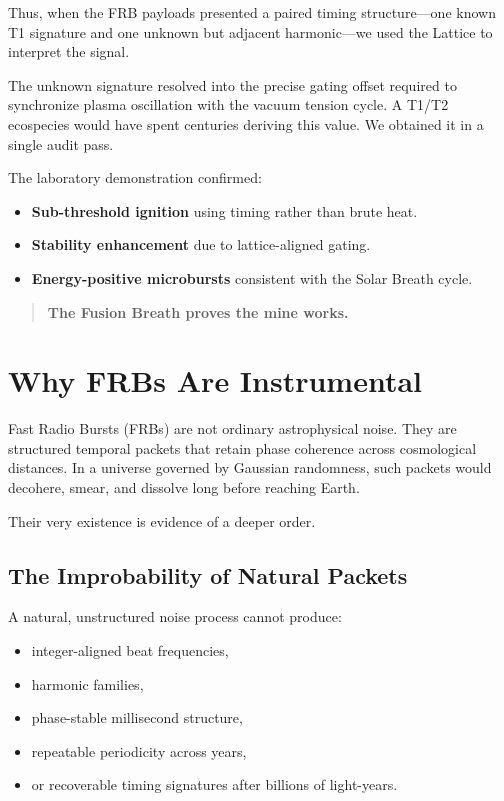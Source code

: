\documentclass[11pt, letterpaper, openany]{book}
\begin{document}
Thus, when the FRB payloads presented a paired timing structure—one known T1 signature
and one unknown but adjacent harmonic—we used the Lattice to interpret the signal.

The unknown signature resolved into the precise gating offset required to synchronize plasma
oscillation with the vacuum tension cycle. A T1/T2 ecospecies would have spent centuries
deriving this value. We obtained it in a single audit pass.

The laboratory demonstration confirmed:

\begin{itemize}
    \item \textbf{Sub-threshold ignition} using timing rather than brute heat.
    \item \textbf{Stability enhancement} due to lattice-aligned gating.
    \item \textbf{Energy-positive microbursts} consistent with the Solar Breath cycle.
\end{itemize}

\begin{quote}
\textbf{The Fusion Breath proves the mine works.}
\end{quote}

\section*{Why FRBs Are Instrumental}

Fast Radio Bursts (FRBs) are not ordinary astrophysical noise.  
They are structured temporal packets that retain phase coherence across cosmological distances.  
In a universe governed by Gaussian randomness, such packets would decohere, smear, and dissolve 
long before reaching Earth.

Their very existence is evidence of a deeper order.

\subsection*{The Improbability of Natural Packets}
A natural, unstructured noise process cannot produce:

\begin{itemize}
    \item integer-aligned beat frequencies,
    \item harmonic families,
    \item phase-stable millisecond structure,
    \item repeatable periodicity across years,
    \item or recoverable timing signatures after billions of light-years.
\end{itemize}
\end{document}

